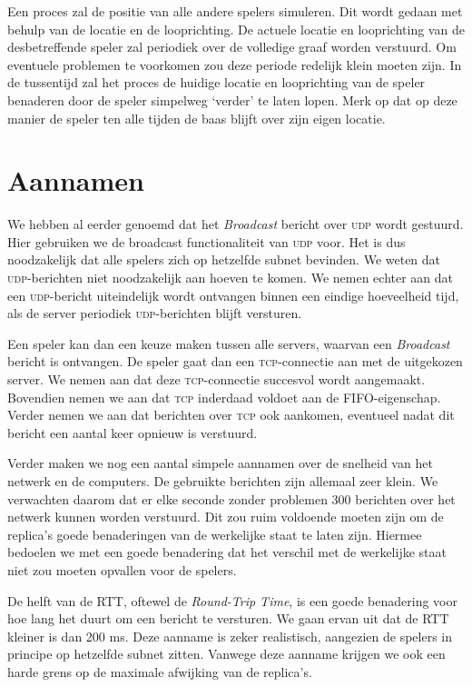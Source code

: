 \documentclass[a4paper,11pt]{article}
\newcommand{\udp}{\textsc{udp}\xspace}
\newcommand{\tcp}{\textsc{tcp}\xspace}
\begin{document}
    Een proces zal de positie van alle andere spelers simuleren. Dit wordt gedaan met behulp van de locatie en de looprichting. De actuele locatie en looprichting van de desbetreffende speler zal periodiek over de volledige graaf worden verstuurd. Om eventuele problemen te voorkomen zou deze periode redelijk klein moeten zijn. In de tussentijd zal het proces de huidige locatie en looprichting van de speler benaderen door de speler simpelweg `verder' te laten lopen. Merk op dat op deze manier de speler ten alle tijden de baas blijft over zijn eigen locatie.

    \section{Aannamen}
    We hebben al eerder genoemd dat het \emph{Broadcast} bericht over \udp wordt gestuurd. Hier gebruiken we de broadcast functionaliteit van \udp voor. Het is dus noodzakelijk dat alle spelers zich op hetzelfde subnet bevinden. We weten dat \udp-berichten niet noodzakelijk aan hoeven te komen. We nemen echter aan dat een \udp-bericht uiteindelijk wordt ontvangen binnen een eindige hoeveelheid tijd, als de server periodiek \udp-berichten blijft versturen.

    Een speler kan dan een keuze maken tussen alle servers, waarvan een \emph{Broadcast} bericht is ontvangen. De speler gaat dan een \tcp-connectie aan met de uitgekozen server. We nemen aan dat deze \tcp-connectie succesvol wordt aangemaakt. Bovendien nemen we aan dat \tcp inderdaad voldoet aan de FIFO-eigenschap. Verder nemen we aan dat berichten over \tcp ook aankomen, eventueel nadat dit bericht een aantal keer opnieuw is verstuurd.

    Verder maken we nog een aantal simpele aannamen over de snelheid van het netwerk en de computers. De gebruikte berichten zijn allemaal zeer klein. We verwachten daarom dat er elke seconde zonder problemen 300 berichten over het netwerk kunnen worden verstuurd. Dit zou ruim voldoende moeten zijn om de replica's goede benaderingen van de werkelijke staat te laten zijn. Hiermee bedoelen we met een goede benadering dat het verschil met de werkelijke staat niet zou moeten opvallen voor de spelers.

    De helft van de RTT, oftewel de \emph{Round-Trip Time}, is een goede benadering voor hoe lang het duurt om een bericht te versturen. We gaan ervan uit dat de RTT kleiner is dan 200 ms. Deze aanname is zeker realistisch, aangezien de spelers in principe op hetzelfde subnet zitten. Vanwege deze aanname krijgen we ook een harde grens op de maximale afwijking van de replica's.
\end{document}

